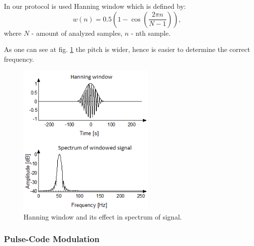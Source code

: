 \documentclass[11pt,titlepage]{article}
\theoremstyle{plain}
\begin{document}
\vspace{5mm}

In our protocol is used Hanning window which is defined by:
\begin{equation}
	 w(n) = 0.5 (1 - \cos\left(\frac{2 \pi n}{N - 1}\right)),
\end{equation}
\newline where $N$ - amount of analyzed samples, $n$ - nth sample. 

\vspace{5mm}

As one can see at fig. \ref{fig:F10} the pitch is wider, hence is easier to determine the correct frequency.
\begin{figure}[H]
	\centering
	\includegraphics[width=0.6\textwidth]{img/hanning_window}
	\caption{Hanning window and its effect in spectrum of signal.}
	\label{fig:F10}
\end{figure}

\subsubsection{Pulse-Code Modulation}
\end{document}
